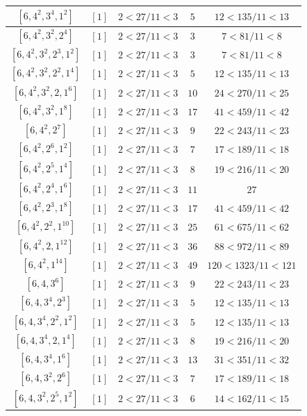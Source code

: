 \documentclass{article}%
\begin{document}
\begin{center}
\begin{longtable}{||c|c|c|c|c||}
$[6, 4^{2}, 3^{4}, 1^{2}]$ & $[1]$ & $2 < 27/11 < 3$ & $5$ & $12 < 135/11 < 13$ \\ \hline 
$[6, 4^{2}, 3^{2}, 2^{4}]$ & $[1]$ & $2 < 27/11 < 3$ & $3$ & $7 < 81/11 < 8$ \\ \hline 
$[6, 4^{2}, 3^{2}, 2^{3}, 1^{2}]$ & $[1]$ & $2 < 27/11 < 3$ & $3$ & $7 < 81/11 < 8$ \\ \hline 
$[6, 4^{2}, 3^{2}, 2^{2}, 1^{4}]$ & $[1]$ & $2 < 27/11 < 3$ & $5$ & $12 < 135/11 < 13$ \\ \hline 
$[6, 4^{2}, 3^{2}, 2, 1^{6}]$ & $[1]$ & $2 < 27/11 < 3$ & $10$ & $24 < 270/11 < 25$ \\ \hline 
$[6, 4^{2}, 3^{2}, 1^{8}]$ & $[1]$ & $2 < 27/11 < 3$ & $17$ & $41 < 459/11 < 42$ \\ \hline 
$[6, 4^{2}, 2^{7}]$ & $[1]$ & $2 < 27/11 < 3$ & $9$ & $22 < 243/11 < 23$ \\ \hline 
$[6, 4^{2}, 2^{6}, 1^{2}]$ & $[1]$ & $2 < 27/11 < 3$ & $7$ & $17 < 189/11 < 18$ \\ \hline 
$[6, 4^{2}, 2^{5}, 1^{4}]$ & $[1]$ & $2 < 27/11 < 3$ & $8$ & $19 < 216/11 < 20$ \\ \hline 
$[6, 4^{2}, 2^{4}, 1^{6}]$ & $[1]$ & $2 < 27/11 < 3$ & $11$ & $27$ \\ \hline 
$[6, 4^{2}, 2^{3}, 1^{8}]$ & $[1]$ & $2 < 27/11 < 3$ & $17$ & $41 < 459/11 < 42$ \\ \hline 
$[6, 4^{2}, 2^{2}, 1^{10}]$ & $[1]$ & $2 < 27/11 < 3$ & $25$ & $61 < 675/11 < 62$ \\ \hline 
$[6, 4^{2}, 2, 1^{12}]$ & $[1]$ & $2 < 27/11 < 3$ & $36$ & $88 < 972/11 < 89$ \\ \hline 
$[6, 4^{2}, 1^{14}]$ & $[1]$ & $2 < 27/11 < 3$ & $49$ & $120 < 1323/11 < 121$ \\ \hline 
$[6, 4, 3^{6}]$ & $[1]$ & $2 < 27/11 < 3$ & $9$ & $22 < 243/11 < 23$ \\ \hline 
$[6, 4, 3^{4}, 2^{3}]$ & $[1]$ & $2 < 27/11 < 3$ & $5$ & $12 < 135/11 < 13$ \\ \hline 
$[6, 4, 3^{4}, 2^{2}, 1^{2}]$ & $[1]$ & $2 < 27/11 < 3$ & $5$ & $12 < 135/11 < 13$ \\ \hline 
$[6, 4, 3^{4}, 2, 1^{4}]$ & $[1]$ & $2 < 27/11 < 3$ & $8$ & $19 < 216/11 < 20$ \\ \hline 
$[6, 4, 3^{4}, 1^{6}]$ & $[1]$ & $2 < 27/11 < 3$ & $13$ & $31 < 351/11 < 32$ \\ \hline 
$[6, 4, 3^{2}, 2^{6}]$ & $[1]$ & $2 < 27/11 < 3$ & $7$ & $17 < 189/11 < 18$ \\ \hline 
$[6, 4, 3^{2}, 2^{5}, 1^{2}]$ & $[1]$ & $2 < 27/11 < 3$ & $6$ & $14 < 162/11 < 15$ \\ \hline 

\end{longtable}
\end{center}
\end{document}
